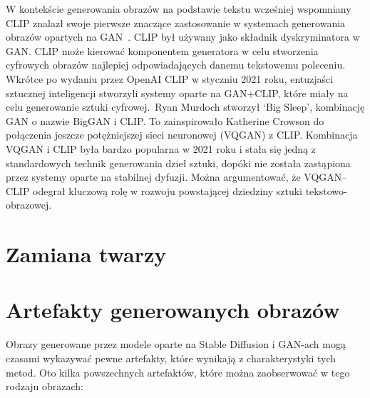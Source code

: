 W kontekście generowania obrazów na podstawie tekstu wcześniej wspomniany CLIP znalazł swoje pierwsze znaczące zastosowanie w systemach generowania obrazów opartych na GAN~\cite{creativity_of_text_to_image}.
CLIP był używany jako składnik dyskryminatora w GAN\@.
CLIP może kierować komponentem generatora w celu stworzenia cyfrowych obrazów najlepiej odpowiadających danemu tekstowemu poleceniu.
Wkrótce po wydaniu przez OpenAI CLIP w styczniu 2021 roku, entuzjaści sztucznej inteligencji stworzyli systemy oparte na GAN+CLIP, które miały na celu generowanie sztuki cyfrowej.\     Ryan Murdoch stworzył `Big Sleep', kombinację GAN o nazwie BigGAN i CLIP. To zainspirowało Katherine Crowson do połączenia jeszcze potężniejszej sieci neuronowej (VQGAN) z CLIP. Kombinacja VQGAN i CLIP była bardzo popularna w 2021 roku i stała się jedną z standardowych technik generowania dzieł sztuki, dopóki nie została zastąpiona przez systemy oparte na stabilnej dyfuzji.
Można argumentować, że VQGAN–CLIP odegrał kluczową rolę w rozwoju powstającej dziedziny sztuki tekstowo-obrazowej.


\section{Zamiana twarzy}


\section{Artefakty generowanych obrazów}
\label{sec:section-artifacts}

Obrazy generowane przez modele oparte na Stable Diffusion i GAN-ach mogą czasami wykazywać pewne artefakty, które wynikają z charakterystyki tych metod.
Oto kilka powszechnych artefaktów, które można zaobserwować w tego rodzaju obrazach:

